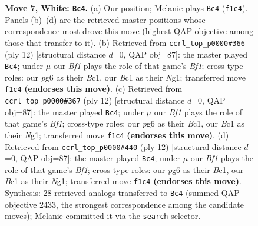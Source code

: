 \documentclass[11pt]{article}
\begin{document}
\begin{figure}[p]
\caption{\textbf{Move 7, White: \texttt{Bc4}.} (a) Our position; Melanie plays \texttt{Bc4} (\texttt{f1c4}). Panels (b)--(d) are the retrieved master positions whose correspondence most drove this move (highest QAP objective among those that transfer to it). (b) Retrieved from \texttt{ccrl\_top\_p0000\#366} (ply 12) [structural distance $d$=0, QAP obj=87]: the master played \texttt{Bc4}; under $\mu$ our \emph{Bf1} plays the role of that game's \emph{Bf1}; cross-type roles: our \emph{p}g6 as their \emph{B}c1, our \emph{B}c1 as their \emph{N}g1; transferred move \texttt{f1c4} \textbf{(endorses this move)}. (c) Retrieved from \texttt{ccrl\_top\_p0000\#367} (ply 12) [structural distance $d$=0, QAP obj=87]: the master played \texttt{Bc4}; under $\mu$ our \emph{Bf1} plays the role of that game's \emph{Bf1}; cross-type roles: our \emph{p}g6 as their \emph{B}c1, our \emph{B}c1 as their \emph{N}g1; transferred move \texttt{f1c4} \textbf{(endorses this move)}. (d) Retrieved from \texttt{ccrl\_top\_p0000\#440} (ply 12) [structural distance $d$=0, QAP obj=87]: the master played \texttt{Bc4}; under $\mu$ our \emph{Bf1} plays the role of that game's \emph{Bf1}; cross-type roles: our \emph{p}g6 as their \emph{B}c1, our \emph{B}c1 as their \emph{N}g1; transferred move \texttt{f1c4} \textbf{(endorses this move)}. Synthesis: 28 retrieved analogs transferred to \texttt{Bc4} (summed QAP objective 2433, the strongest correspondence among the candidate moves); Melanie committed it via the \texttt{search} selector.}
\label{fig:thought-m12}
\end{figure}

\clearpage
\end{document}
